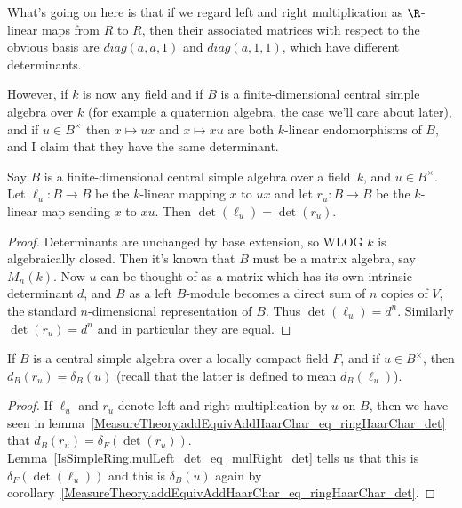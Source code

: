 What's going on here is that if we regard left and right multiplication as $\R$-linear
maps from $R$ to $R$, then their associated matrices with respect to the obvious basis
are $diag(a,a,1)$ and $diag(a,1,1)$, which have different determinants.

However, if $k$ is now any field and if $B$ is a finite-dimensional central
simple algebra over $k$ (for example a quaternion algebra, the case we'll care about later),
and if $u\in B^\times$ then $x\mapsto ux$ and $x\mapsto xu$
are both $k$-linear endomorphisms of $B$, and I claim that they have
the same determinant.

\begin{lemma}
  \label{IsSimpleRing.mulLeft_det_eq_mulRight_det}
  \leanok
  Say $B$ is a finite-dimensional central simple algebra over a field~$k$,
  and $u\in B^\times$. Let $\ell_u:B\to B$ be the $k$-linear mapping $x$ to $ux$ and
  let $r_u:B\to B$ be the $k$-linear map sending $x$ to $xu$. Then
  $\det(\ell_u)=\det(r_u)$.
\end{lemma}
\begin{proof}
  \leanok
  Determinants are unchanged by base extension, so WLOG $k$ is algebraically closed.
  Then it's known that $B$ must be a matrix algebra, say $M_n(k)$. Now $u$ can be thought
  of as a matrix which has its own intrinsic determinant $d$, and $B$ as a left $B$-module
  becomes a direct sum of $n$ copies of $V$, the standard $n$-dimensional representation of $B$.
  Thus $\det(\ell_u)=d^n$. Similarly $\det(r_u)=d^n$ and in particular they are equal.
\end{proof}

\begin{corollary}
  \label{IsSimpleRing.ringHaarChar_eq_addEquivAddHaarChar_mulRight}
  \leanok
  If $B$ is a central simple algebra over a locally compact field $F$, and if $u\in B^\times$,
  then $d_B(r_u)=\delta_B(u)$ (recall that the latter is defined to mean $d_B(\ell_u)$).
\end{corollary}
\begin{proof}
  \leanok
  If $\ell_u$ and $r_u$ denote left and right multiplication by $u$ on $B$, then we have
  seen in lemma~\ref{MeasureTheory.addEquivAddHaarChar_eq_ringHaarChar_det} that $d_B(r_u)=\delta_F(\det(r_u))$.
  Lemma~\ref{IsSimpleRing.mulLeft_det_eq_mulRight_det} tells
  us that this is $\delta_F(\det(\ell_u))$ and this is $\delta_B(u)$ again by
  corollary~\ref{MeasureTheory.addEquivAddHaarChar_eq_ringHaarChar_det}.
\end{proof}

